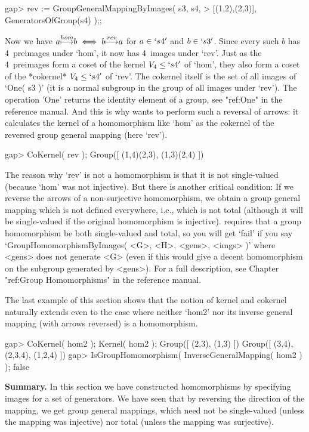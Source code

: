 \beginexample
gap> rev := GroupGeneralMappingByImages( s3, s4,
>           [(1,2),(2,3)], GeneratorsOfGroup(s4) );;
\endexample

Now we have 
$a {\buildrel hom\over\longmapsto} b \iff b {\buildrel rev\over\longmapsto} a$
for $a\in `s4'$ and $b\in `s3'$. Since every
such $b$ has 4~preimages under `hom', it now has 4~images under `rev'.
Just as the 4~preimages form a coset of the kernel $V_4\le `s4'$ of
`hom', they also form a coset of the *cokernel* $V_4\le `s4'$ of
`rev'.  The cokernel itself is the set of all images of `One( s3 )'
(it is a normal subgroup in the group of all images under `rev'). The
operation 'One' returns the identity element of a group, see "ref:One"
in the reference manual.  And this is why {\GAP} wants to perform such
a reversal of arrows: it calculates the kernel of a homomorphism like
`hom' as the cokernel of the reversed group general mapping (here `rev').

\beginexample
gap> CoKernel( rev );
Group([ (1,4)(2,3), (1,3)(2,4) ])
\endexample

The  reason  why  `rev'   is not  a    homomorphism is  that   it is  not
single-valued  (because `hom' was   not injective). But there  is another
critical  condition: If   we   reverse the arrows   of  a  non-surjective
homomorphism,  we  obtain a group  general mapping  which  is not defined
everywhere, i.e.,  which is not total  (although it will be single-valued
if the original homomorphism is  injective). {\GAP} requires that a group
homomorphism be  both  single-valued  and total,
so you will get `fail' if you say
`GroupHomomorphismByImages( <G>, <H>, <gens>, <imgs> )' where <gens> does
not generate <G> (even if this would give a decent homomorphism on the
subgroup generated by <gens>).  For a full description,
see Chapter "ref:Group Homomorphisms" in the reference manual.

The last  example of this   section shows that  the  notion of kernel and
cokernel naturally extends even to the case  where neither `hom2' nor its
inverse general mapping (with arrows reversed) is a homomorphism.

\beginexample
gap> CoKernel( hom2 );  Kernel( hom2 );
Group([ (2,3), (1,3) ])
Group([ (3,4), (2,3,4), (1,2,4) ])
gap> IsGroupHomomorphism( InverseGeneralMapping( hom2 ) );
false
\endexample

{\bf  Summary.}   In this section   we  have constructed homomorphisms by
specifying images for a set of generators. We have seen that by reversing
the direction of  the mapping, we get  group general mappings, which need
not be single-valued (unless the mapping was injective) nor total (unless
the mapping was surjective).

